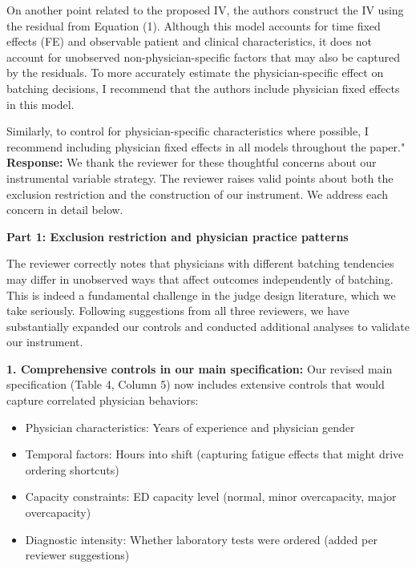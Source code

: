 \documentclass[11pt]{article}
\newenvironment{quote2}
{ \bigskip
\noindent
         \small\em
         \baselineskip=14pt
}
\newcommand{\1}{\hbox{\rm 1\kern-.35em 1}}
\begin{document}
{\begin{quote2}
On another point related to the proposed IV, the authors construct the IV using the residual from Equation (1). Although this model accounts for time fixed effects (FE) and observable patient and clinical characteristics, it does not account for unobserved non-physician-specific factors that may also be captured by the residuals. To more accurately estimate the physician-specific effect on batching decisions, I recommend that the authors include physician fixed effects in this model.

Similarly, to control for physician-specific characteristics where possible, I recommend including physician fixed effects in all models throughout the paper."
\end{quote2}

\noindent\textbf{Response:} \color{blue}
We thank the reviewer for these thoughtful concerns about our instrumental variable strategy. The reviewer raises valid points about both the exclusion restriction and the construction of our instrument. We address each concern in detail below.

\textbf{Part 1: Exclusion restriction and physician practice patterns}

The reviewer correctly notes that physicians with different batching tendencies may differ in unobserved ways that affect outcomes independently of batching. This is indeed a fundamental challenge in the judge design literature, which we take seriously. Following suggestions from all three reviewers, we have substantially expanded our controls and conducted additional analyses to validate our instrument.

\textbf{1. Comprehensive controls in our main specification:}
Our revised main specification (Table 4, Column 5) now includes extensive controls that would capture correlated physician behaviors:

\begin{itemize}
 
\item Physician characteristics: Years of experience and physician gender

\item Temporal factors: Hours into shift (capturing fatigue effects that might drive ordering shortcuts)

\item Capacity constraints: ED capacity level (normal, minor overcapacity, major overcapacity)

\item Diagnostic intensity: Whether laboratory tests were ordered (added per reviewer suggestions)
\end{itemize}

}
\end{document}
